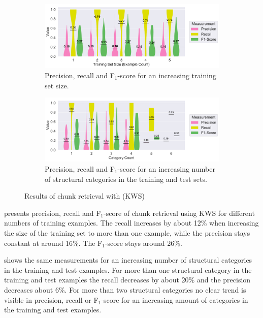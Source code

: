 \begin{figure}
\begin{subfigure}[b]{\columnwidth}
		\centering
		\includegraphics[width=\columnwidth, clip]{img/big-study/recall-precision-examplecount-KWS.pdf}
		\caption{Precision, recall and F$_{1}$-score for an increasing training set size.}
		\label{fig:recall-precision-examplecount-KWS}
\end{subfigure}\hspace{\fill}
\begin{subfigure}[b]{\columnwidth}
		\centering
		\includegraphics[width=\columnwidth, clip]{img/big-study/recall-precision-categorycount-KWS.pdf}
		\caption{Precision, recall and F$_{1}$-score for an increasing number of structural categories in the training and test sets.}
		\label{fig:recall-precision-categorycount-KWS}
\end{subfigure}
\caption{Results of chunk retrieval with  (KWS)}
\end{figure}


 presents precision, recall and F$_{1}$-score of chunk retrieval using KWS for different numbers of training examples.
The recall increases by about 12\% when increasing the size of the training set to more than one example, while the precision stays constant at around 16\%.
The F$_{1}$-score stays around 26\%.

 shows the same measurements for an increasing number of structural categories in the training and test examples.
For more than one structural category in the training and test examples the recall decreases by about 20\% and the precision decreases about 6\%.
For more than two structural categories no clear trend is visible in precision, recall or F$_{1}$-score for an increasing amount of categories in the training and test examples.

